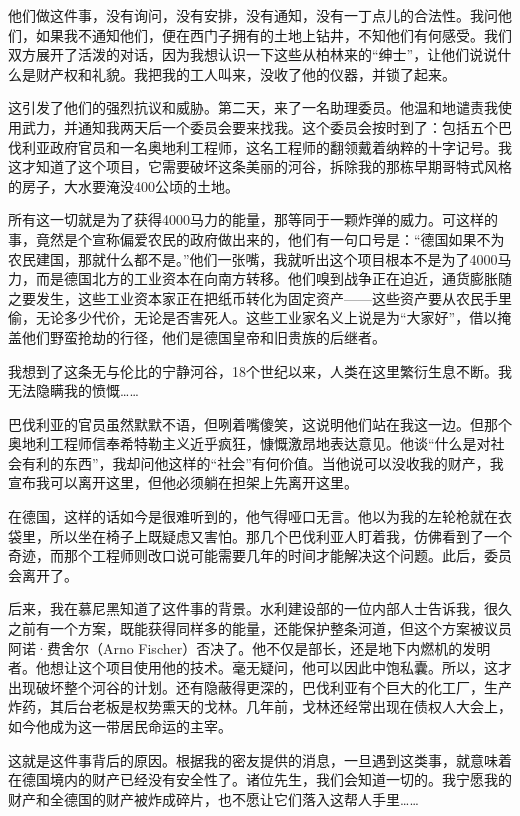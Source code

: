 \documentclass[UTF8]{ctexart}
\begin{document}
他们做这件事，没有询问，没有安排，没有通知，没有一丁点儿的合法性。我问他们，如果我不通知他们，便在西门子拥有的土地上钻井，不知他们有何感受。我们双方展开了活泼的对话，因为我想认识一下这些从柏林来的“绅士”，让他们说说什么是财产权和礼貌。我把我的工人叫来，没收了他的仪器，并锁了起来。

这引发了他们的强烈抗议和威胁。第二天，来了一名助理委员。他温和地谴责我使用武力，并通知我两天后一个委员会要来找我。这个委员会按时到了：包括五个巴伐利亚政府官员和一名奥地利工程师，这名工程师的翻领戴着纳粹的十字记号。我这才知道了这个项目，它需要破坏这条美丽的河谷，拆除我的那栋早期哥特式风格的房子，大水要淹没400公顷的土地。

所有这一切就是为了获得4000马力的能量，那等同于一颗炸弹的威力。可这样的事，竟然是个宣称偏爱农民的政府做出来的，他们有一句口号是：“德国如果不为农民建国，那就什么都不是。”他们一张嘴，我就听出这个项目根本不是为了4000马力，而是德国北方的工业资本在向南方转移。他们嗅到战争正在迫近，通货膨胀随之要发生，这些工业资本家正在把纸币转化为固定资产——这些资产要从农民手里偷，无论多少代价，无论是否害死人。这些工业家名义上说是为“大家好”，借以掩盖他们野蛮抢劫的行径，他们是德国皇帝和旧贵族的后继者。

我想到了这条无与伦比的宁静河谷，18个世纪以来，人类在这里繁衍生息不断。我无法隐瞒我的愤慨……

巴伐利亚的官员虽然默默不语，但咧着嘴傻笑，这说明他们站在我这一边。但那个奥地利工程师信奉希特勒主义近乎疯狂，慷慨激昂地表达意见。他谈“什么是对社会有利的东西”，我却问他这样的“社会”有何价值。当他说可以没收我的财产，我宣布我可以离开这里，但他必须躺在担架上先离开这里。

在德国，这样的话如今是很难听到的，他气得哑口无言。他以为我的左轮枪就在衣袋里，所以坐在椅子上既疑虑又害怕。那几个巴伐利亚人盯着我，仿佛看到了一个奇迹，而那个工程师则改口说可能需要几年的时间才能解决这个问题。此后，委员会离开了。

后来，我在慕尼黑知道了这件事的背景。水利建设部的一位内部人士告诉我，很久之前有一个方案，既能获得同样多的能量，还能保护整条河道，但这个方案被议员阿诺·费舍尔（Arno Fischer）否决了。他不仅是部长，还是地下内燃机的发明者。他想让这个项目使用他的技术。毫无疑问，他可以因此中饱私囊。所以，这才出现破坏整个河谷的计划。还有隐蔽得更深的，巴伐利亚有个巨大的化工厂，生产炸药，其后台老板是权势熏天的戈林。几年前，戈林还经常出现在债权人大会上，如今他成为这一带居民命运的主宰。

这就是这件事背后的原因。根据我的密友提供的消息，一旦遇到这类事，就意味着在德国境内的财产已经没有安全性了。诸位先生，我们会知道一切的。我宁愿我的财产和全德国的财产被炸成碎片，也不愿让它们落入这帮人手里……
\end{document}
